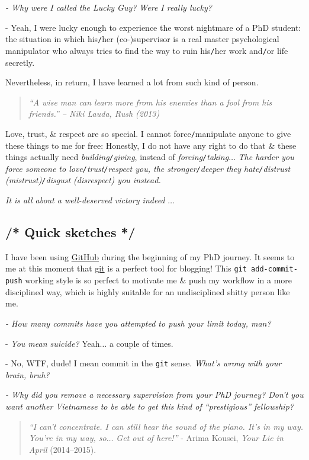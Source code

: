 \documentclass[12pt,oneside]{book}
\begin{document}
{\it - Why were I called the Lucky Guy? Were I really lucky?}

- Yeah, I were lucky enough to experience the worst nightmare of a PhD student: the situation in which his{\tt/}her (co-)supervisor is a real master psychological manipulator who always tries to find the way to ruin his{\tt/}her work and{\tt/}or life secretly.

Nevertheless, in return, I have learned a lot from such kind of person.

\begin{quote}\it
	``A wise man can learn more from his enemies than a fool from his friends.'' -- {\sc Niki Lauda}, Rush (2013)
\end{quote}
Love, trust, \& respect are so special. I cannot force{\tt/}manipulate anyone to give these things to me for free: Honestly, I do not have any right to do that \& these things actually need {\it building{\tt/}giving}, instead of {\it forcing{\tt/}taking}$\ldots$ {\it The harder you force someone to love{\tt/}trust{\tt/}respect you, the stronger{\tt/}deeper they hate{\tt/}distrust (mistrust){\tt/}disgust (disrespect) you instead.}

{\it It is all about a well-deserved victory indeed} $\ldots$

\subsection{{\color{gray}/* Quick sketches */}}
 I have been using \href{https://github.com}{GitHub} during the beginning of my PhD journey. It seems to me at this moment that \href{https://git-scm.com/}{git} is a perfect tool for blogging! This {\tt git add-commit-push} working style is so perfect to motivate me \& push my workflow in a more disciplined way, which is highly suitable for an undisciplined shitty person like me.

{\it - How many commits have you attempted to push your limit today, man?}

- {\it You mean suicide?} Yeah$\ldots$ a couple of times.

- No, WTF, dude! I mean commit in the {\tt git} sense. {\it What's wrong with your brain, bruh?}

{\it - Why did you remove a necessary supervision from your PhD journey? Don't you want another Vietnamese to be able to get this kind of ``prestigious'' fellowship?}

\begin{quote}
	{\it``I can't concentrate. I can still hear the sound of the piano. It's in my way. You're in my way, so$\ldots$ Get out of here!''} - Arima Kousei, {\it Your Lie in April}  (2014--2015).
\end{quote}
\end{document}
